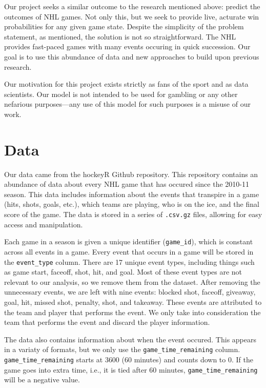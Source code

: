 \documentclass[11pt]{article}
\begin{document}
Our project seeks a similar outcome to the research mentioned above: predict the outcomes of NHL games. Not only this,
but we seek to provide live, acturate win probabilities for any given game state. Despite the simplicity of the problem statement, 
as mentioned, the solution is not so straightforward. The NHL provides fast-paced games with many events
occuring in quick succession. Our goal is to use this abundance of data and new approaches to build upon previous research.

Our motivation for this project exists strictly as fans of the sport and as data scientists. Our model is not intended to be used for gambling or any other
nefarious purposes—any use of this model for such purposes is a misuse of our work.

\section{Data}
Our data came from the hockeyR Github repository\cite{hockeyR-data}. This repository contains an abundance of data about every NHL game
that has occured since the 2010-11 season. This data includes information about the events that transpire in a game (hits, shots, goals, etc.),
which teams are playing, who is on the ice, and the final score of the game. The data is stored in a series of {\tt .csv.gz} files, allowing for
easy access and manipulation.

Each game in a season is given a unique identifier ({\tt game\_id}), which is constant across all events in a game. Every event that occurs in a game
will be stored in the {\tt event\_type} column. There are 17 unique event types, including things such as game start, faceoff, shot, hit, and goal.
Most of these event types are not relevant to our analysis, so we remove them from the dataset. After removing the unnecessary events, we are left with
nine events: blocked shot, faceoff, giveaway, goal, hit, missed shot, penalty, shot, and takeaway. These events are attributed to the
team and player that performs the event. We only take into consideration the team that performs the event and discard the player information.

The data also contains information about when the event occured. This appears in a variaty of formats, but we only
use the {\tt game\_time\_remaining} column. {\tt game\_time\_remaining} starts
at 3600 (60 minutes) and counts down to 0. If the game goes into extra time, i.e., it is tied after 60 minutes, {\tt game\_time\_remaining} will
be a negative value.
\end{document}

